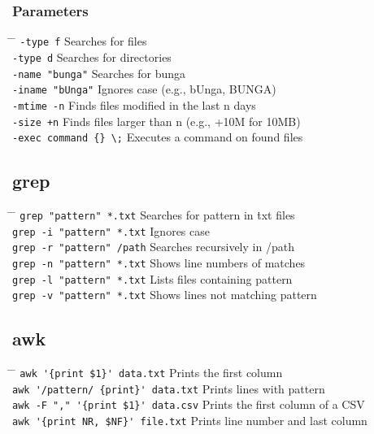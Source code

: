 \documentclass[a4paper,10pt]{article}
\begin{document}
\subsubsection*{Parameters}
\begin{tabbing}
	\= \hspace{60mm} \= \hspace{80mm} \kill
	\> \verb|-type f| \> Searches for files \\
	\> \verb|-type d| \> Searches for directories \\
	\> \verb|-name "bunga"| \> Searches for bunga \\
	\> \verb|-iname "bUnga"| \> Ignores case (e.g., bUnga, BUNGA) \\
	\> \verb|-mtime -n| \> Finds files modified in the last n days \\
	\> \verb|-size +n| \> Finds files larger than n (e.g., +10M for 10MB) \\
	\> \verb|-exec command {} \;| \> Executes a command on found files \\
\end{tabbing}

\subsection{grep}
\begin{tabbing}
	\= \hspace{60mm} \= \hspace{80mm} \kill
	\> \verb|grep "pattern" *.txt| \> Searches for pattern in \.txt files \\
	\> \verb|grep -i "pattern" *.txt| \> Ignores case \\
	\> \verb|grep -r "pattern" /path| \> Searches recursively in /path \\
	\> \verb|grep -n "pattern" *.txt| \> Shows line numbers of matches \\
	\> \verb|grep -l "pattern" *.txt| \> Lists files containing pattern \\
	\> \verb|grep -v "pattern" *.txt| \> Shows lines not matching pattern \\
\end{tabbing}

\subsection{awk}
\begin{tabbing}
	\= \hspace{60mm} \= \hspace{80mm} \kill
	\> \verb|awk '{print $1}' data.txt| \> Prints the first column \\
	\> \verb|awk '/pattern/ {print}' data.txt| \> Prints lines with pattern \\
	\> \verb|awk -F "," '{print $1}' data.csv| \> Prints the first column of a CSV \\
	\> \verb|awk '{print NR, $NF}' file.txt| \> Prints line number and last column \\
\end{tabbing}
\end{document}
